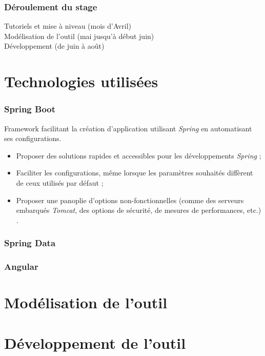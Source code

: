 \documentclass{beamer}
\begin{document}
\begin{frame}
\frametitle{Déroulement du stage}

Tutoriels et mise à niveau (mois d'Avril)\\
Modélisation de l'outil (mai jusqu'à début juin)\\
Développement (de juin à août)

\end{frame}

\section{Technologies utilisées}

\begin{frame}
\frametitle{Spring Boot}

Framework facilitant la création d'application utilisant \textit{Spring} en automatisant ses configurations.

\begin{itemize}
	\item Proposer des solutions rapides et accessibles pour les développements \textit{Spring} ;
	\item Faciliter les configurations, même lorsque les paramètres souhaités diffèrent de ceux utilisés par défaut ;
	\item Proposer une panoplie d'options non-fonctionnelles (comme des serveurs embarqués \textit{Tomcat}, des options de sécurité, de mesures de performances, etc.) .
\end{itemize}

\end{frame}

\begin{frame}
\frametitle{Spring Data}

\end{frame}

\begin{frame}
\frametitle{Angular}

\end{frame}

\section{Modélisation de l'outil}

\begin{frame}
\frametitle{}


\end{frame}

\section{Développement de l'outil}
\end{document}
